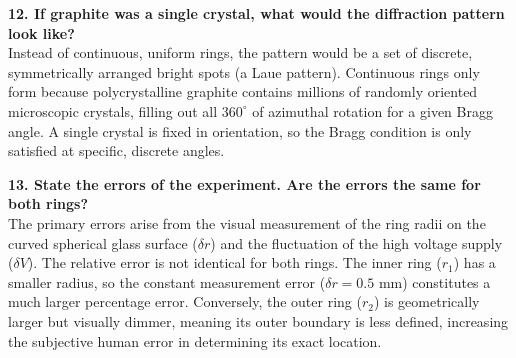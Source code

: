 \documentclass[a4paper,11pt]{article}
\begin{document}
\noindent\textbf{12. If graphite was a single crystal, what would the diffraction pattern look like?} \\
Instead of continuous, uniform rings, the pattern would be a set of discrete, symmetrically arranged bright spots (a Laue pattern). Continuous rings only form because polycrystalline graphite contains millions of randomly oriented microscopic crystals, filling out all $360^\circ$ of azimuthal rotation for a given Bragg angle. A single crystal is fixed in orientation, so the Bragg condition is only satisfied at specific, discrete angles.

\noindent\textbf{13. State the errors of the experiment. Are the errors the same for both rings?} \\
The primary errors arise from the visual measurement of the ring radii on the curved spherical glass surface ($\delta r$) and the fluctuation of the high voltage supply ($\delta V$). The relative error is not identical for both rings. The inner ring ($r_1$) has a smaller radius, so the constant measurement error ($\delta r = 0.5\text{ mm}$) constitutes a much larger percentage error. Conversely, the outer ring ($r_2$) is geometrically larger but visually dimmer, meaning its outer boundary is less defined, increasing the subjective human error in determining its exact location.
\end{document}
